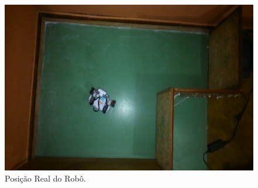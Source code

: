 \begin{figure}[H]
  \centering
  \includegraphics[scale=1]{figuras/cen3_ex5/real.eps}
  \caption[Posição Real do Robô]{Posição Real do Robô.}
  \label{img:cen3_ex5_real}
\end{figure}

